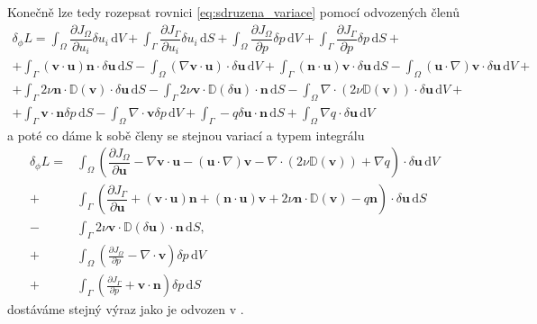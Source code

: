 Konečně lze tedy rozepsat rovnici \ref{eq:sdruzena_variace} pomocí odvozených členů
\begin{multline*}
\delta_\phi L = 
\int_{\Omega} \dfrac{\partial J_{\Omega}}{\partial u_i} \delta u_i \, \mathrm{d}V 
+ 
\int_{\Gamma} \dfrac{\partial J_{\Gamma}}{\partial u_i} \delta u_i \, \mathrm{d}S
+
\int_{\Omega} \dfrac{\partial J_{\Omega}}{\partial p} \delta p  \, \mathrm{d}V 
+ 
\int_{\Gamma} \dfrac{\partial J_{\Gamma}}{\partial p} \delta p  \, \mathrm{d}S
+\\+
\int_{\Gamma} 
(\mathbf{v}\cdot \mathbf{u} )\mathbf{n} \cdot \delta\mathbf{u}
\, \mathrm{d}S
-
\int_{\Omega} 
(\nabla \mathbf{v}\cdot \mathbf{u})\cdot\delta \mathbf{u}
\, \mathrm{d}V
+
\int_{\Gamma} 
(\mathbf{n} \cdot \mathbf{u}) \mathbf{v}\cdot \delta \mathbf{u} 
\, \mathrm{d}S
-
\int_{\Omega} 
(\mathbf{u} \cdot \nabla)\mathbf{v}\cdot \delta \mathbf{u}
\, \mathrm{d}V
+\\+
\int_{\Gamma} 
2\nu \mathbf{n} \cdot  \mathbb{D}(\mathbf{v})\cdot \delta \mathbf{u}
\, \mathrm{d}S
- \int_{\Gamma} 
2\nu \mathbf{v} \cdot  \mathbb{D}(\delta \mathbf{u})\cdot \mathbf{n}
\, \mathrm{d}S
-
\int_{\Omega} 
\nabla \cdot \left( 2\nu \mathbb{D}(\mathbf{v}) \right) \cdot \delta \mathbf{u}
\, \mathrm{d}V
+\\+
\int_{\Gamma} 
\mathbf{v}\cdot \mathbf{n} \delta p 
\, \mathrm{d}S
-
\int_{\Omega} 
\nabla \cdot \mathbf{v} \delta p
\, \mathrm{d}V
+
\int_{\Gamma} 
- q \delta \mathbf{u \cdot n}
\, \mathrm{d}S
+
\int_{\Omega} 
\nabla q \cdot \delta \mathbf{u}
\, \mathrm{d}V
\end{multline*}
a poté co dáme k sobě členy se stejnou variací a typem integrálu
\begin{align*}
\delta_\phi L = 
&\int_{\Omega} 
\left(
\dfrac{\partial J_{\Omega}}{\partial \mathbf{u}}
- \nabla \mathbf{v}\cdot \mathbf{u}
- (\mathbf{u} \cdot \nabla)\mathbf{v}
- \nabla \cdot \left( 2\nu \mathbb{D}(\mathbf{v}) \right)
+ \nabla q
\right)
\cdot \delta \mathbf{u}
\, \mathrm{d}V
\\+
&\int_{\Gamma}
\left(
\dfrac{\partial J_{\Gamma}}{\partial \mathbf{u}}
+ (\mathbf{v}\cdot \mathbf{u} )\mathbf{n} 
+ (\mathbf{n} \cdot \mathbf{u}) \mathbf{v}
+ 2\nu \mathbf{n} \cdot  \mathbb{D}(\mathbf{v})
- q \mathbf{n}
\right)
\cdot \delta \mathbf{u}
\, \mathrm{d}S
\\-
&\int_{\Gamma} 
2\nu \mathbf{v} \cdot  \mathbb{D}(\delta \mathbf{u})\cdot \mathbf{n}
\, \mathrm{d}S,
\\+
&\int_{\Omega} 
\left(
\frac{\partial J_\Omega}{\partial p}
- \nabla \cdot \mathbf{v}
\right)
\delta p
\, \mathrm{d}V
\\+
&\int_{\Gamma}
\left(
\frac{\partial J_\Gamma}{\partial p}
+ \mathbf{v} \cdot \mathbf{n}
\right)
 \delta p
\, \mathrm{d}S
\end{align*}
dostáváme stejný výraz jako je odvozen v \cite{othmer2008continuous}.

